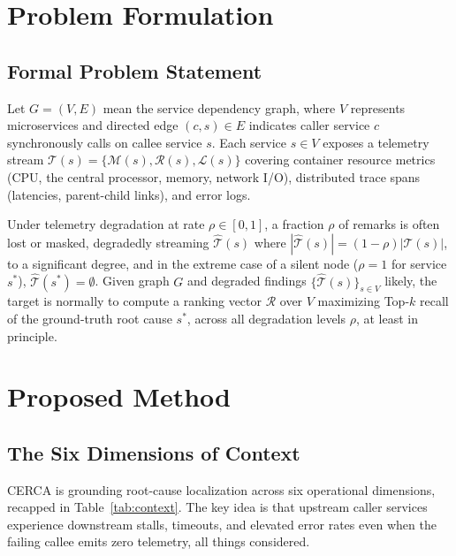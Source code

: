 \documentclass[conference]{IEEEtran}
\begin{document}
\section{Problem Formulation}

\subsection{Formal Problem Statement}
Let $G = (V, E)$ mean the service dependency graph, where $V$ represents microservices and directed edge $(c, s) \in E$ indicates caller service $c$ synchronously calls on callee service $s$. Each service $s \in V$ exposes a telemetry stream $\mathcal{T}(s) = \{\mathcal{M}(s), \mathcal{R}(s), \mathcal{L}(s)\}$ covering container resource metrics (CPU, the central processor, memory, network I/O), distributed trace spans (latencies, parent-child links), and error logs.

Under telemetry degradation at rate $\rho \in [0, 1]$, a fraction $\rho$ of remarks is often lost or masked, degradedly streaming $\hat{\mathcal{T}}(s)$ where $|\hat{\mathcal{T}}(s)| = (1 - \rho) |\mathcal{T}(s)|$, to a significant degree, and in the extreme case of a silent node ($\rho = 1$ for service $s^*$), $\hat{\mathcal{T}}(s^*) = \emptyset$. Given graph $G$ and degraded findings $\{\hat{\mathcal{T}}(s)\}_{s\in V}$ likely, the target is normally to compute a ranking vector $\mathcal{R}$ over $V$ maximizing Top-$k$ recall of the ground-truth root cause $s^*$, across all degradation levels $\rho$, at least in principle.

\section{Proposed Method}

\subsection{The Six Dimensions of Context}
CERCA is grounding root-cause localization across six operational dimensions, recapped in Table~\ref{tab:context}. The key idea is that upstream caller services experience downstream stalls, timeouts, and elevated error rates even when the failing callee emits zero telemetry, all things considered.
\end{document}
